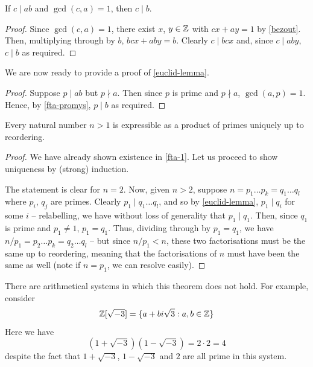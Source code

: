 \documentclass{../template/note}
\begin{document}
    \begin{lemma}
        If \(c \mid ab\) and \(\gcd(c, a) = 1\), then \(c \mid b\).
        \label{fta-promys}
    \end{lemma}
    
    \begin{proof}
        Since \(\gcd(c, a) = 1\), there exist \(x\), \(y \in \mathbb Z\) with \(cx + ay = 1\) by \cref{bezout}. Then, multiplying through by \(b\), \(bcx + aby = b\). Clearly \(c \mid bcx\) and, since \(c \mid aby\), \(c \mid b\) as required.
    \end{proof}
    
    We are now ready to provide a proof of \cref{euclid-lemma}.

    \begin{proof}
        Suppose \(p \mid ab\) but \(p \nmid a\). Then since \(p\) is prime and \(p \nmid a\), \(\gcd(a, p) = 1\). Hence, by \cref{fta-promys}, \(p \mid b\) as required.
    \end{proof}
    
    \begin{theorem}
        Every natural number \(n > 1\) is expressible as a product of primes uniquely up to reordering.
        \label{fta}
    \end{theorem}
    
    \begin{proof}
        We have already shown existence in \cref{fta-1}. Let us proceed to show uniqueness by (strong) induction.

        The statement is clear for \(n=2\). Now, given \(n > 2\), suppose \(n = p_1\dots p_k = q_1\dots q_l\) where \(p_i\), \(q_j\) are primes. Clearly \(p_1 \mid q_1 \dots q_l\), and so by \cref{euclid-lemma}, \(p_1 \mid q_i\) for some \(i\) -- relabelling, we have without loss of generality that \(p_1 \mid q_1\). Then, since \(q_1\) is prime and \(p_1 \neq 1\), \(p_1 = q_1\). Thus, dividing through by \(p_1 = q_1\), we have \(n/p_1 = p_2\dots p_k = q_2 \dots q_l\) -- but since \(n/p_1 < n\), these two factorisations must be the same up to reordering, meaning that the factorisations of \(n\) must have been the same as well (note if \(n=p_1\), we can resolve easily).
    \end{proof}
    

    \begin{remark*}
        There are arithmetical systems in which this theorem does not hold. For example, consider
        \[
            \mathbb Z[\sqrt{-3}] = \{a + bi\sqrt{3}: a, b \in \mathbb Z\}
        \]
        Here we have
        \[
            (1 + \sqrt{-3})(1 - \sqrt{-3}) = 2 \cdot 2 = 4
        \]
        despite the fact that \(1 + \sqrt{-3}\), \(1 - \sqrt{-3}\) and \(2\) are all prime in this system.
    \end{remark*}
    
\end{document}
